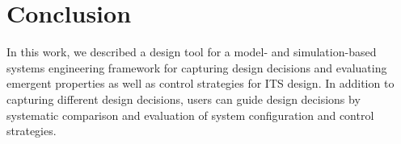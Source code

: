 \documentclass[a4paper,twoside]{article}
\begin{document}
	\section{Conclusion}
	\label{sec:conclusion}
	
In this work, we described a design tool for a model- and simulation-based systems engineering framework for capturing design decisions and evaluating emergent properties as well as control strategies for ITS design. In addition to capturing different design decisions, users can guide design decisions by systematic comparison and evaluation of system configuration and control strategies.
	
	
	{\small
		}
	
	
\end{document}
